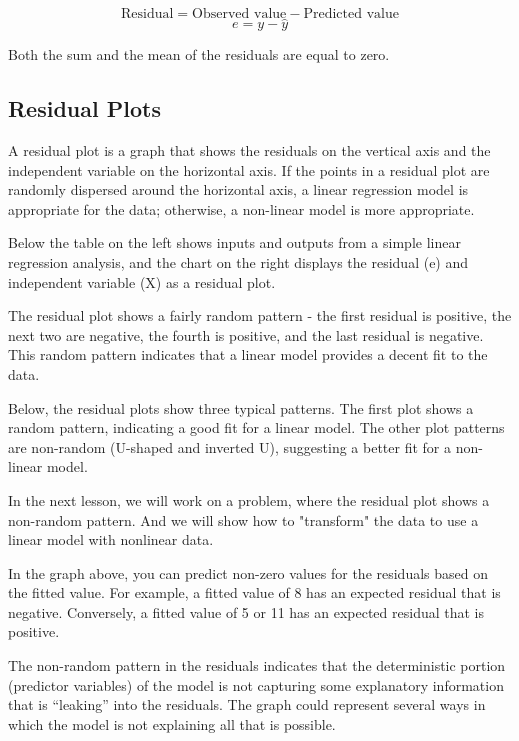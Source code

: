 \documentclass[12pt]{article}
\begin{document}
\[\mbox{Residual} = \mbox{Observed value} - \mbox{Predicted value}\] 
\[e = y - \hat{y}\]

Both the sum and the mean of the residuals are equal to zero. 

\subsection{Residual Plots}
A residual plot is a graph that shows the residuals on the vertical axis and the independent variable on the horizontal axis. If the points in a residual plot are randomly dispersed around the horizontal axis, a linear regression model is appropriate for the data; otherwise, a non-linear model is more appropriate.

Below the table on the left shows inputs and outputs from a simple linear regression analysis, and the chart on the right displays the residual (e) and independent variable (X) as a residual plot.

\newpage
The residual plot shows a fairly random pattern - the first residual is positive, the next two are negative, the fourth is positive, and the last residual is negative. This random pattern indicates that a linear model provides a decent fit to the data.

Below, the residual plots show three typical patterns. The first plot shows a random pattern, indicating a good fit for a linear model. The other plot patterns are non-random (U-shaped and inverted U), suggesting a better fit for a non-linear model.

		
In the next lesson, we will work on a problem, where the residual plot shows a non-random pattern. And we will show how to "transform" the data to use a linear model with nonlinear data.

\newpage
In the graph above, you can predict non-zero values for the residuals based on the fitted value. For example, a fitted value of 8 has an expected residual that is negative. Conversely, a fitted value of 5 or 11 has an expected residual that is positive.

The non-random pattern in the residuals indicates that the deterministic portion (predictor variables) of the model is not capturing some explanatory information that is “leaking” into the residuals. The graph could represent several ways in which the model is not explaining all that is possible. 
\end{document}
